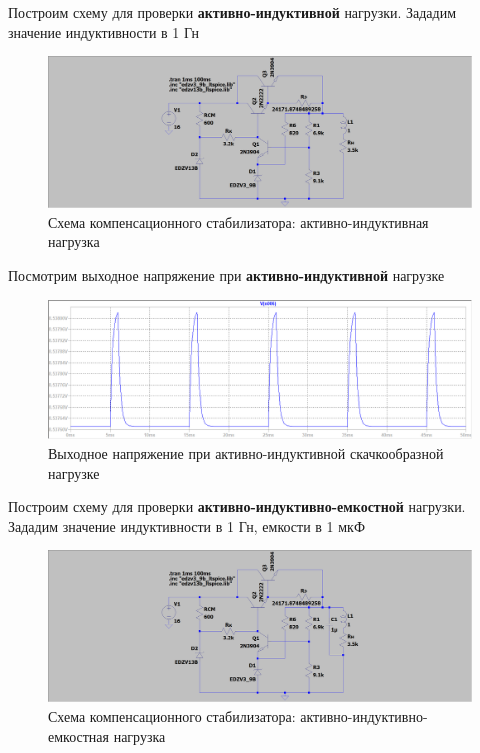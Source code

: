 \documentclass[a4paper, 12pt]{article}
\begin{document}
    \noindent Построим схему для проверки \textbf{активно-индуктивной} нагрузки. Зададим
    значение индуктивности в 1 Гн
    \begin{figure}[H]
        \centering
        \includegraphics[scale=0.22]{3task_scheme_AL.png}
        \captionsetup{skip=0pt}
        \caption{Схема компенсационного стабилизатора: активно-индуктивная нагрузка}
        \label{fig:3task_scheme_AL}
    \end{figure}
    \noindent Посмотрим выходное напряжение при \textbf{активно-индуктивной} нагрузке
    \begin{figure}[H]
        \centering
        \includegraphics[scale=0.46]{3task_rect_AL.png}
        \captionsetup{skip=0pt}
        \caption{Выходное напряжение при активно-индуктивной скачкообразной нагрузке}
        \label{fig:3task_rect_AL}
    \end{figure}
    \noindent Построим схему для проверки \textbf{активно-индуктивно-емкостной} нагрузки. Зададим
    значение индуктивности в 1 Гн, емкости в 1 мкФ
    \begin{figure}[H]
        \centering
        \includegraphics[scale=0.22]{3task_scheme_ALC.png}
        \captionsetup{skip=0pt}
        \caption{Схема компенсационного стабилизатора: активно-индуктивно-емкостная нагрузка}
        \label{fig:3task_scheme_ALC}
    \end{figure}
\end{document}
